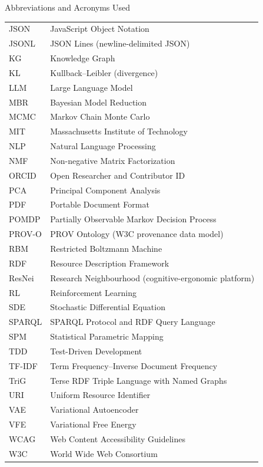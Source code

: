 \documentclass[
  ignorenonframetext,
]{beamer}
\begin{document}
\begin{frame}[allowframebreaks]{Abbreviations and Acronyms Used}
\begin{table}[H]
\begin{tabular}{ll}
JSON & JavaScript Object Notation \\
JSONL & JSON Lines (newline-delimited JSON) \\
KG & Knowledge Graph \\
KL & Kullback--Leibler (divergence) \\
LLM & Large Language Model \\
MBR & Bayesian Model Reduction \\
MCMC & Markov Chain Monte Carlo \\
MIT & Massachusetts Institute of Technology \\
NLP & Natural Language Processing \\
NMF & Non-negative Matrix Factorization \\
ORCID & Open Researcher and Contributor ID \\
PCA & Principal Component Analysis \\
PDF & Portable Document Format \\
POMDP & Partially Observable Markov Decision Process \\
PROV-O & PROV Ontology (W3C provenance data model) \\
RBM & Restricted Boltzmann Machine \\
RDF & Resource Description Framework \\
ResNei & Research Neighbourhood (cognitive-ergonomic platform) \\
RL & Reinforcement Learning \\
SDE & Stochastic Differential Equation \\
SPARQL & SPARQL Protocol and RDF Query Language \\
SPM & Statistical Parametric Mapping \\
TDD & Test-Driven Development \\
TF-IDF & Term Frequency--Inverse Document Frequency \\
TriG & Terse RDF Triple Language with Named Graphs \\
URI & Uniform Resource Identifier \\
VAE & Variational Autoencoder \\
VFE & Variational Free Energy \\
WCAG & Web Content Accessibility Guidelines \\
W3C & World Wide Web Consortium \\
\bottomrule
\end{tabular}
\end{table}
\end{frame}
\end{document}
